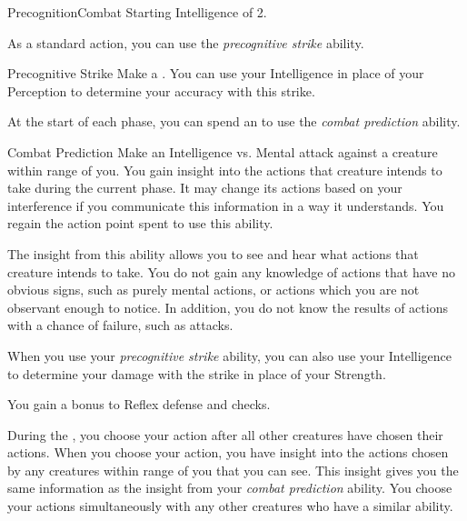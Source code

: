     \begin{feat}{Precognition}{Combat}
        \featpre Starting Intelligence of 2.

         As a standard action, you can use the \textit{precognitive strike} ability.
        \begin{ability}{Precognitive Strike}
            Make a .
            You can use your Intelligence in place of your Perception to determine your accuracy with this strike.
        \end{ability}

         At the start of each phase, you can spend an  to use the \textit{combat prediction} ability.
        \begin{ability}{Combat Prediction}
            Make an Intelligence vs. Mental attack against a creature within \rngmed range of you.
            \hit You gain insight into the actions that creature intends to take during the current phase.
                It may change its actions based on your interference if you communicate this information in a way it understands.
            \miss You regain the action point spent to use this ability.

            The insight from this ability allows you to see and hear what actions that creature intends to take.
            You do not gain any knowledge of actions that have no obvious signs, such as purely mental actions, or actions which you are not observant enough to notice.
            In addition, you do not know the results of actions with a chance of failure, such as attacks.
        \end{ability}

         When you use your \textit{precognitive strike} ability, you can also use your Intelligence to determine your damage with the strike in place of your Strength.

         You gain a  bonus to Reflex defense and  checks.

         During the , you choose your action after all other creatures have chosen their actions.
        When you choose your action, you have insight into the actions chosen by any creatures within \rngclose range of you that you can see.
        This insight gives you the same information as the insight from your \textit{combat prediction} ability.
        You choose your actions simultaneously with any other creatures who have a similar ability.


\end{feat}
